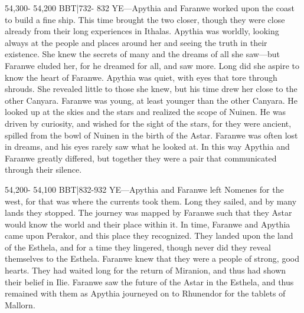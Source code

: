 \documentclass[smalldemyvopaper,11pt,twoside,onecolumn,openright,extrafontsizes]{memoir}
\begin{document}
{{54,300- 54,200 BBT|732- 832 YE—Apythia and Faranwe worked upon the coast to build a fine ship. This time brought the two closer, though they were close already from their long experiences in Ithalas. Apythia was worldly, looking always at the people and places around her and seeing the truth in their existence. She knew the secrets of many and the dreams of all she saw—but Faranwe eluded her, for he dreamed for all, and saw more. Long did she aspire to know the heart of Faranwe. Apythia was quiet, with eyes that tore through shrouds. She revealed little to those she knew, but his time drew her close to the other Canyara. Faranwe was young, at least younger than the other Canyara. He looked up at the skies and the stars and realized the scope of Nuinen. He was driven by curiosity, and wished for the sight of the stars, for they were ancient, spilled from the bowl of Nuinen in the birth of the Astar. Faranwe was often lost in dreams, and his eyes rarely saw what he looked at. In this way Apythia and Faranwe greatly differed, but together they were a pair that communicated through their silence.

54,200- 54,100 BBT|832-932 YE—Apythia and Faranwe left Nomenes for the west, for that was where the currents took them. Long they sailed, and by many lands they stopped. The journey was mapped by Faranwe such that they Astar would know the world and their place within it. In time, Faranwe and Apythia came upon Perakor, and this place they recognized. They landed upon the land of the Esthela, and for a time they lingered, though never did they reveal themselves to the Esthela. Faranwe knew that they were a people of strong, good hearts. They had waited long for the return of Miranion, and thus had shown their belief in Ilie. Faranwe saw the future of the Astar in the Esthela, and thus remained with them as Apythia journeyed on to Rhunendor for the tablets of Mallorn.

}}
\end{document}

